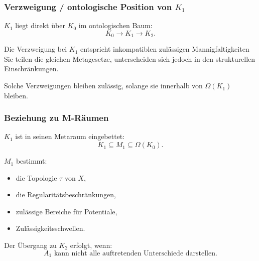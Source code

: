 \subsubsection{Verzweigung / ontologische Position von \texorpdfstring{$K_1$}{K_1}}

$K_1$ liegt direkt über $K_0$ im ontologischen Baum:
\[
K_0 \to K_1 \to K_2.
\]

Die Verzweigung bei $K_1$ entspricht inkompatiblen zulässigen Mannigfaltigkeiten
Sie teilen die gleichen Metagesetze, unterscheiden sich jedoch in den strukturellen Einschränkungen.

Solche Verzweigungen bleiben zulässig, solange sie innerhalb von $\Omega(K_1)$ bleiben.

\subsubsection{Beziehung zu M-Räumen}

$K_1$ ist in seinen Metaraum eingebettet:
\[
K_1 \subseteq M_1 \subseteq \Omega(K_0).
\]

$M_1$ bestimmt:
\begin{itemize}
    \item die Topologie $\tau$ von $X$,
    \item die Regularitätsbeschränkungen,
    \item zulässige Bereiche für Potentiale,
    \item Zulässigkeitsschwellen.
\end{itemize}

Der Übergang zu $K_2$ erfolgt, wenn:
\[
A_1 \text{ kann nicht alle auftretenden Unterschiede darstellen.}
\]
